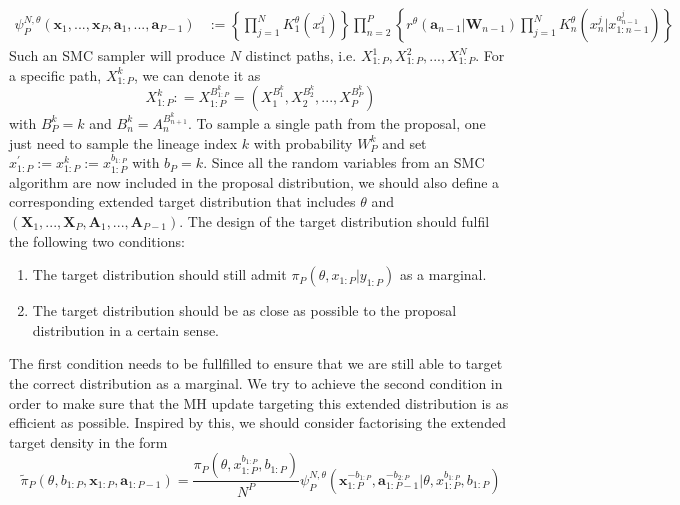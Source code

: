 \documentclass[12pt,a4paper]{article}
\begin{document}
\begin{equation}
    \label{JointDensity-of-SMC}
    \begin{split}
        \psi_P^{N,\theta}(\textbf{x}_1,...,\textbf{x}_P,\textbf{a}_1,...,\textbf{a}_{P-1}) & := \left\{\prod_{j=1}^{N}K_1^{\theta}\left(x_1^j\right)\right\}\prod_{n=2}^{P}\left\{r^{\theta}\left(\textbf{a}_{n-1}|\textbf{W}_{n-1}\right)\prod_{j=1}^{N}K_n^{\theta}\left(x_n^j|x_{1:n-1}^{a_{n-1}^j}\right)\right\}
    \end{split}
\end{equation}
Such an SMC sampler will produce $N$ distinct paths, i.e. $X_{1:P}^1, X_{1:P}^2,...,X_{1:P}^N$. For a specific path, $X_{1:P}^k$, we can denote it as 
$$X_{1:P}^k : = X_{1:P}^{B_{1:P}^k}=\left(X_1^{B_1^k},X_2^{B_2^k},...,X_P^{B_P^k}\right)$$
with $B_P^k = k$ and $B_n^k = A_{n}^{B_{n+1}^k}$. To sample a single path from the proposal, one just need to sample the lineage index $k$ with probability $W_P^k$ and set $x_{1:P}^{'}:= x_{1:P}^{k}:=x_{1:P}^{b_{1:P}}$ with $b_P = k$. Since all the random variables from an SMC algorithm are now included in the proposal distribution, we should also define a corresponding extended target distribution that includes $\theta$ and $\left(\mathbf{X}_1,...,\mathbf{X}_P,\mathbf{A}_1,...,\mathbf{A}_{P-1}\right)$. The design of the target distribution should fulfil the following two conditions:
\begin{enumerate}[label=\textit{Condition \arabic*.},leftmargin=*]
    \item The target distribution should still admit $\pi_P(\theta,x_{1:P}|y_{1:P})$ as a marginal.
    \item The target distribution should be as close as possible to the proposal distribution in a certain sense.
\end{enumerate}
The first condition needs to be fullfilled to ensure that we are still able to target the correct distribution as a marginal. We try to achieve the second condition in order to make sure that the MH update targeting this extended distribution is as efficient as possible. Inspired by this, we should consider factorising the extended target density in the form
\begin{equation}
    \label{PMCMC-Form of extended target}
    \tilde{\pi}_P(\theta,b_{1:P},\mathbf{x}_{1:P},\mathbf{a}_{1:P-1}) = \frac{\pi_{P}(\theta,x_{1:P}^{b_{1:P}},b_{1:P})}{N^P}\psi_P^{N,\theta}(\mathbf{x}_{1:P}^{-b_{1:P}},\mathbf{a}_{1:P-1}^{-b_{2:P}}|\theta,x_{1:P}^{b_{1:P}},b_{1:P})
\end{equation}  
\end{document}
